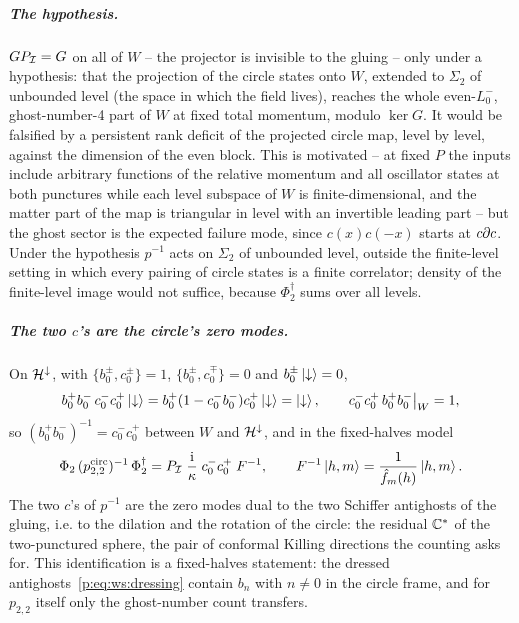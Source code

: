 \subparagraph{The hypothesis.}
$G P_{{\mathcal{I}}} = G$ on all of $W$ – the projector is invisible to the gluing – only under a hypothesis: that the projection of the circle states onto $W$, extended to $\Sigma_2$ of unbounded level (the space in which the field lives), reaches the whole even-$L_0^-$, ghost-number-4 part of $W$ at fixed total momentum, modulo $\ker G$.
It would be falsified by a persistent rank deficit of the projected circle map, level by level, against the dimension of the even block.
This is motivated – at fixed $P$ the inputs include arbitrary functions of the relative momentum and all oscillator states at both punctures while each level subspace of $W$ is finite-dimensional, and the matter part of the map is triangular in level with an invertible leading part – but the ghost sector is the expected failure mode, since $c(x) c(-x)$ starts at $c \partial c$.
Under the hypothesis $p^{-1}$ acts on $\Sigma_2$ of unbounded level, outside the finite-level setting in which every pairing of circle states is a finite correlator; density of the finite-level image would not suffice, because $\Phi_2^\dagger$ sums over all levels.

\subparagraph{The two $c$'s are the circle's zero modes.}
On ${\mathcal{H}}^\downarrow$, with $\{b_0^\pm, c_0^\pm\} = 1$, $\{b_0^\pm, c_0^\mp\} = 0$ and $b_0^\pm \ket{\downarrow} = 0$,
\begin{equation}
  \label{icg:eq:zero-modes}
  b_0^+ b_0^- \, c_0^- c_0^+ \ket{\downarrow}
    = b_0^+ (1 - c_0^- b_0^-) c_0^+ \ket{\downarrow}
    = \ket{\downarrow},
  \qquad
  c_0^- c_0^+ \, b_0^+ b_0^- \big|_W
    = 1,
\end{equation}
so $(b_0^+ b_0^-)^{-1} = c_0^- c_0^+$ between $W$ and ${\mathcal{H}}^\downarrow$, and in the fixed-halves model
\begin{equation}
  \label{icg:eq:inverse}
  \Phi_2 \, (p^{\rm circ}_{2,2})^{-1} \, \Phi_2^\dagger
    = P_{{\mathcal{I}}} \; \frac{\mathrm{i}}{\kappa} \; c_0^- c_0^+ \; F^{-1},
  \qquad
  F^{-1} \ket{h, m}
    = \frac{1}{\hat f_m(h)} \ket{h, m}.
\end{equation}
The two $c$'s of $p^{-1}$ are the zero modes dual to the two Schiffer antighosts of the gluing, i.e. to the dilation and the rotation of the circle: the residual $\mathbb{C}^*$ of the two-punctured sphere, the pair of conformal Killing directions the counting asks for.
This identification is a fixed-halves statement: the dressed antighosts~\eqref{p:eq:ws:dressing} contain $b_n$ with $n \neq 0$ in the circle frame, and for $p_{2,2}$ itself only the ghost-number count transfers.

